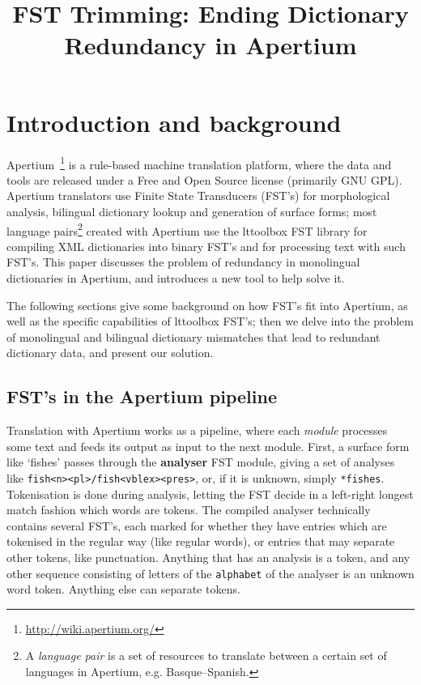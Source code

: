 \documentclass[10pt, a4paper]{article}
\title{FST Trimming: Ending Dictionary Redundancy in Apertium} %
\newcommand{\ana}[1]{\texttt{#1}}
\newcommand{\f}[1]{`#1'}
\begin{document}
\maketitleabstract

\section{Introduction and background}

Apertium~\cite{forcada2011afp}\footnote{\href{http://wiki.apertium.org/}{http://wiki.apertium.org/}}
is a rule-based machine translation platform, where the data and tools
are released under a Free and Open Source license (primarily GNU GPL).
Apertium translators use Finite State Transducers (FST's) for
morphological analysis, bilingual dictionary lookup and generation of
surface forms; most language pairs\footnote{A \emph{language pair} is
  a set of resources to translate between a certain set of languages
  in Apertium, e.g. Basque--Spanish.} created with Apertium use the
lttoolbox FST library for compiling XML dictionaries into binary FST's
and for processing text with such FST's. This paper discusses the
problem of redundancy in monolingual dictionaries in Apertium, and
introduces a new tool to help solve it.

The following sections give some background on how FST's fit into
Apertium, as well as the specific capabilities of lttoolbox
FST's; then we delve into the problem of monolingual and bilingual
dictionary mismatches that lead to redundant dictionary data, and
present our solution.

\subsection{FST's in the Apertium pipeline}
\label{sec:pipeline}

Translation with Apertium works as a pipeline, where each
\emph{module} processes some text and feeds its output as input to the
next module. First, a surface form like \f{fishes} passes through the
\textbf{analyser} FST module, giving a set of analyses like
\ana{fish<n><pl>/fish<vblex><pres>}, or, if it is unknown, simply
\ana{*fishes}. Tokenisation is done during analysis, letting the FST
decide in a left-right longest match fashion which words are tokens.
The compiled analyser technically contains several FST's, each marked
for whether they have entries which are tokenised in the regular
way (like regular words), or entries that may separate other tokens,
like punctuation. Anything that has an analysis is a token, and any
other sequence consisting of letters of the \texttt{alphabet} of the
analyser is an unknown word token. Anything else can separate tokens.
\end{document}
